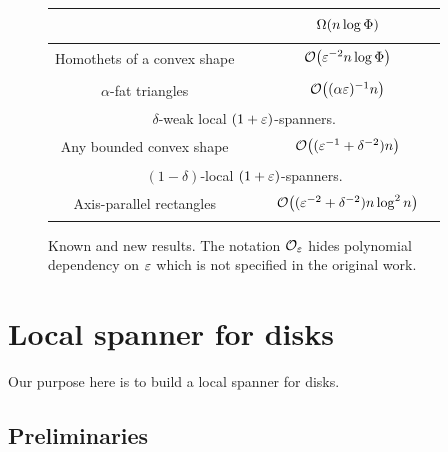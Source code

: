 \documentclass[12pt]{article}%
\begin{document}
\begin{figure}
\begin{tabular}{|c|c|c||c|c|}
		&
		&
		&
		$\Omega(n \log \Phi)\Bigr.$
		&
		\lemref{l:s:lower:bound}%
		\\
		\hline
		Homothets of a convex shape
		&
		&
		&
		$\Of\pth{ \eps^{-2} n\log \spread  }\Bigr.$
		&
		\thmref{l:s:homothets}%
		\\
		\hline
		$\alpha$-fat triangles
		&
		&
		&
		$\Of\pth{ (\alpha\eps)^{-1} n}\Bigr.$
		&
		\thmref{l:s:triangle}%
		\\
		\hline
		\multicolumn{5}{c}{$\delta$-weak local $(1+\varepsilon)$-spanners$\Bigr.$}
		\\
		\hline
		Any bounded convex shape
		&
		&
		&
		$\mathcal{O}\bigl( (\varepsilon^{-1} + \delta^{-2}) n \bigr)\Bigr. $
		&
		\lemref{w:l:s:regions}%
		\\
		\hline
		\multicolumn{5}{c}{$(1-\delta)$-local $(1+\varepsilon)$-spanners$\Bigr.$}
		\\
		\hline%
		Axis-parallel rectangles
		&
		&
		&
		$\mathcal{O}\bigl((\varepsilon^{-2} + \delta^{-2}) n \log^2 n \bigr)\Bigr.$ 
		&
		\thmref{a:l:s:rectangles}%
		\\
		\hline
    \end{tabular}
    \caption{Known and new results. The notation $\mathcal{O}_\varepsilon$ hides
       polynomial dependency on $\varepsilon$ which is not specified in the
       original work.}
\end{figure}


	
	
\section{Local spanner for disks}
Our purpose here is to build a local spanner for disks.

\subsection{Preliminaries}
\end{document}
